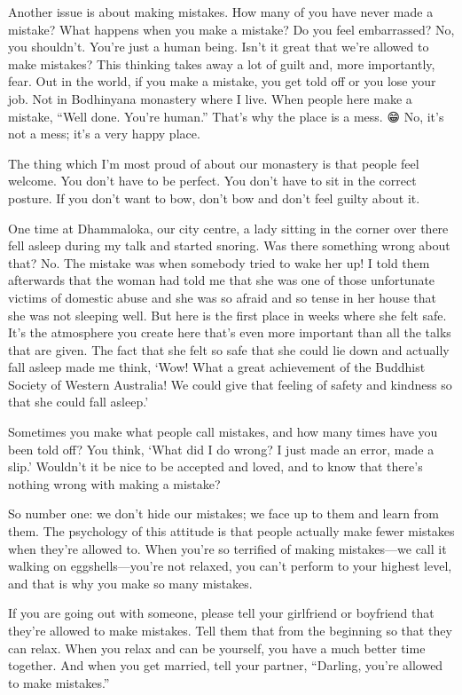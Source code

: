 \documentclass[12pt, openany]{book}
\begin{document}
Another issue is about making mistakes. How many of you have never made a mistake? What happens when you make a mistake? Do you feel embarrassed? No, you shouldn’t. You’re just a human being. Isn’t it great that we’re allowed to make mistakes? This thinking takes away a lot of guilt and, more importantly, fear. Out in the world, if you make a mistake, you get told off or you lose your job. Not in Bodhinyana monastery where I live. When people here make a mistake, “Well done. You’re human.” That’s why the place is a mess. 😁 No, it’s not a mess; it’s a very happy place. 

The thing which I’m most proud of about our monastery is that people feel welcome. You don’t have to be perfect. You don’t have to sit in the correct posture. If you don’t want to bow, don’t bow and don’t feel guilty about it. 

One time at Dhammaloka, our city centre, a lady sitting in the corner over there fell asleep during my talk and started snoring. Was there something wrong about that? No. The mistake was when somebody tried to wake her up! I told them afterwards that the woman had told me that she was one of those unfortunate victims of domestic abuse and she was so afraid and so tense in her house that she was not sleeping well. But here is the first place in weeks where she felt safe. It’s the atmosphere you create here that’s even more important than all the talks that are given. The fact that she felt so safe that she could lie down and actually fall asleep made me think, ‘Wow! What a great achievement of the Buddhist Society of Western Australia! We could give that feeling of safety and kindness so that she could fall asleep.’ 

Sometimes you make what people call mistakes, and how many times have you been told off? You think, ‘What did I do wrong? I just made an error, made a slip.’ Wouldn’t it be nice to be accepted and loved, and to know that there’s nothing wrong with making a mistake? 

So number one: we don’t hide our mistakes; we face up to them and learn from them. The psychology of this attitude is that people actually make fewer mistakes when they’re allowed to. When you’re so terrified of making mistakes—we call it walking on eggshells—you’re not relaxed, you can’t perform to your highest level, and that is why you make so many mistakes. 

If you are going out with someone, please tell your girlfriend or boyfriend that they’re allowed to make mistakes. Tell them that from the beginning so that they can relax. When you relax and can be yourself, you have a much better time together. And when you get married, tell your partner, “Darling, you’re allowed to make mistakes.” 
\end{document}
